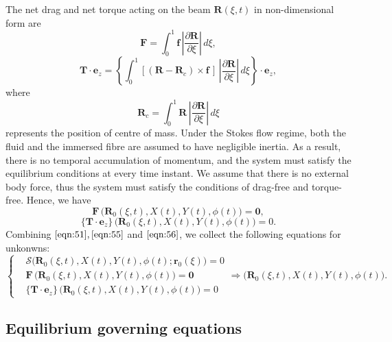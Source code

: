 \documentclass[lineno]{JFM-FLM_Au}
\begin{document}
The net drag and net torque acting on the beam $\mathbf{R}(\xi,t)$ in non-dimensional form are 
\begin{equation}
	\label{eqn:52}
	\mathbf{F}=\int^1_0 \mathbf{f}\, \left|\frac{\partial\mathbf{R}}{\partial\xi}\right|\,d\xi, 
\end{equation}
\begin{equation}
	\label{eqn:53}
	\mathbf{T}\cdot\mathbf{e}_z=\left\{\int^1_0 \left[(\mathbf{R}-\mathbf{R}_c)\times \mathbf{f}\,\right]\,\left|\frac{\partial\mathbf{R}}{\partial\xi}\right|\,d\xi\right\}\cdot\mathbf{e}_z,
\end{equation}
where 
\begin{equation}
	\label{eqn:54}
	\mathbf{R}_c=\int^1_0 \mathbf{R}\,\left|\frac{\partial\mathbf{R}}{\partial\xi}\right|\,d\xi
\end{equation}
represents the position of centre of mass. Under the Stokes flow regime, both the fluid and the immersed fibre are assumed to have negligible inertia. As a result, there is no temporal accumulation of momentum, and the system must satisfy the equilibrium conditions at every time instant. We assume that there is no external body force, thus the system must satisfy the conditions of drag-free and torque-free. Hence, we have 
\begin{equation}
	\label{eqn:55}
	\mathbf{F}\,\Big(\mathbf{R}_0(\xi,t), X(t), Y(t), \phi(t)\Big)=\mathbf{0},
\end{equation}
\begin{equation}
	\label{eqn:56}
	\{\mathbf{T}\cdot\mathbf{e}_z\}\,\Big(\mathbf{R}_0(\xi,t), X(t), Y(t), \phi(t)\Big)=0.
\end{equation} 
Combining $\eqref{eqn:51}, \eqref{eqn:55}$ and $\eqref{eqn:56}$, we collect the following equations for unkonwns:
\begin{equation}
	\label{eqn:57}
	\left\{\begin{aligned}
		&\mathbf{\mathcal{S}}\Big(\mathbf{R}_0(\xi,t), X(t), Y(t),\phi(t);\mathbf{r}_0(\xi)\Big)=0\\
		&\mathbf{F}\,\Big(\mathbf{R}_0(\xi,t), X(t), Y(t),\phi(t)\Big)=\mathbf{0}\\
		&\{\mathbf{T}\cdot\mathbf{e}_z\}\,\Big(\mathbf{R}_0(\xi,t), X(t), Y(t),\phi(t)\Big)=0
	\end{aligned}\right.\Longrightarrow \Big(\mathbf{R}_0(\xi,t), X(t), Y(t),\phi(t)\Big).
\end{equation}

\subsection{Equilibrium governing equations}
\end{document}
